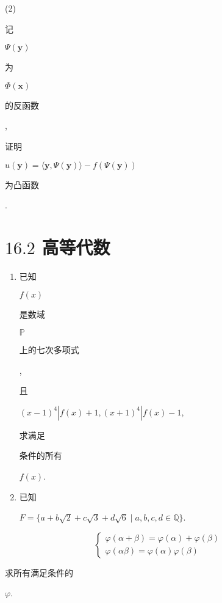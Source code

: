 \documentclass[10pt]{article}
\begin{document}
(2) \begin{CJK}{UTF8}{mj}记\end{CJK} $\Psi(\boldsymbol{y})$ \begin{CJK}{UTF8}{mj}为\end{CJK} $\Phi(\boldsymbol{x})$ \begin{CJK}{UTF8}{mj}的反函数\end{CJK}, \begin{CJK}{UTF8}{mj}证明\end{CJK} $u(\boldsymbol{y})=\langle\boldsymbol{y}, \Psi(\boldsymbol{y})\rangle-f(\Psi(\boldsymbol{y}))$ \begin{CJK}{UTF8}{mj}为凸函数\end{CJK}.

\section{$16.2$ 高等代数}
\begin{enumerate}
  \item \begin{CJK}{UTF8}{mj}已知\end{CJK} $f(x)$ \begin{CJK}{UTF8}{mj}是数域\end{CJK} $\mathbb{P}$ \begin{CJK}{UTF8}{mj}上的七次多项式\end{CJK}, \begin{CJK}{UTF8}{mj}且\end{CJK} $(x-1)^{4}\left|f(x)+1,(x+1)^{4}\right| f(x)-1$, \begin{CJK}{UTF8}{mj}求满足\end{CJK} \begin{CJK}{UTF8}{mj}条件的所有\end{CJK} $f(x)$.

  \item \begin{CJK}{UTF8}{mj}已知\end{CJK} $F=\{a+b \sqrt{2}+c \sqrt{3}+d \sqrt{6} \mid a, b, c, d \in \mathbb{Q}\}$.

\end{enumerate}
$$
\left\{\begin{array}{l}
\varphi(\alpha+\beta)=\varphi(\alpha)+\varphi(\beta) \\
\varphi(\alpha \beta)=\varphi(\alpha) \varphi(\beta)
\end{array}\right.
$$
\begin{CJK}{UTF8}{mj}求所有满足条件的\end{CJK} $\varphi$.
\end{document}
